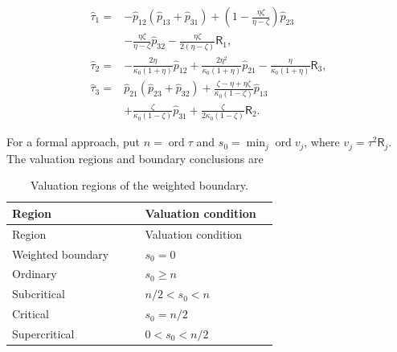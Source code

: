 \begin{equation}\label{supp:r3:RRreconstruction}
\begin{aligned}
\widehat\tau_1={}&-\widehat p_{12}(\widehat p_{13}+\widehat p_{31})
 +\left(1-\frac{\eta \zeta }{\eta -\zeta }\right)\widehat p_{23}\\
 &-\frac{\eta \zeta }{\eta -\zeta }\widehat p_{32}-\frac{\eta \zeta }{2(\eta -\zeta )}\mathsf R_1,\\
\widehat\tau_2={}&-\frac{2\eta }{\kappa_0 (1+\eta )}\widehat p_{12}
 +\frac{2\eta ^2}{\kappa_0 (1+\eta )}\widehat p_{21}-\frac{\eta }{\kappa_0 (1+\eta )}\mathsf R_3,\\
\widehat\tau_3={}&\widehat p_{21}(\widehat p_{23}+\widehat p_{32})
 +\frac{\zeta -\eta +\eta \zeta }{\kappa_0 (1-\zeta )}\widehat p_{13}\\
 &+\frac{\zeta }{\kappa_0 (1-\zeta )}\widehat p_{31}+\frac{\zeta }{2\kappa_0 (1-\zeta )}\mathsf R_2.
\end{aligned}
\end{equation}

For a formal approach, put $n=\operatorname{ord}\tau$ and
$s_0=\min_j\operatorname{ord}v_j$, where $v_j=\tau^2\mathsf R_j$.
The valuation regions and boundary conclusions are

\begin{longtable}{@{}>{\raggedright\arraybackslash}p{0.46\linewidth}>{\raggedright\arraybackslash}p{0.46\linewidth}@{}}
\caption{Valuation regions of the weighted boundary.}\label{supp:tab:r3-valuations}\\
\toprule Region & Valuation condition\\\midrule\endfirsthead
\toprule Region & Valuation condition\\\midrule\endhead
Weighted boundary & $s_0=0$\\
Ordinary & $s_0\ge n$\\
Subcritical & $n/2<s_0<n$\\
Critical & $s_0=n/2$\\
Supercritical & $0<s_0<n/2$\\
\bottomrule\end{longtable}

